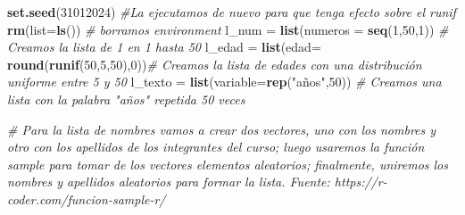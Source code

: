 \documentclass[
]{article}
\newenvironment{Shaded}{\begin{snugshade}}{\end{snugshade}}
\newcommand{\AttributeTok}[1]{\textcolor[rgb]{0.13,0.29,0.53}{#1}}
\newcommand{\CommentTok}[1]{\textcolor[rgb]{0.56,0.35,0.01}{\textit{#1}}}
\newcommand{\DecValTok}[1]{\textcolor[rgb]{0.00,0.00,0.81}{#1}}
\newcommand{\FunctionTok}[1]{\textcolor[rgb]{0.13,0.29,0.53}{\textbf{#1}}}
\newcommand{\NormalTok}[1]{#1}
\newcommand{\OtherTok}[1]{\textcolor[rgb]{0.56,0.35,0.01}{#1}}
\newcommand{\StringTok}[1]{\textcolor[rgb]{0.31,0.60,0.02}{#1}}
\begin{document}
\begin{Shaded}
\begin{Highlighting}[]
\FunctionTok{set.seed}\NormalTok{(}\DecValTok{31012024}\NormalTok{) }\CommentTok{\#La ejecutamos de nuevo para que tenga efecto sobre el runif}
\FunctionTok{rm}\NormalTok{(}\AttributeTok{list=}\FunctionTok{ls}\NormalTok{())   }\CommentTok{\# borramos environment}
\NormalTok{l\_num }\OtherTok{=} \FunctionTok{list}\NormalTok{(}\AttributeTok{numeros =} \FunctionTok{seq}\NormalTok{(}\DecValTok{1}\NormalTok{,}\DecValTok{50}\NormalTok{,}\DecValTok{1}\NormalTok{)) }\CommentTok{\# Creamos la lista de 1 en 1 hasta 50}
\NormalTok{l\_edad }\OtherTok{=} \FunctionTok{list}\NormalTok{(}\AttributeTok{edad=} \FunctionTok{round}\NormalTok{(}\FunctionTok{runif}\NormalTok{(}\DecValTok{50}\NormalTok{,}\DecValTok{5}\NormalTok{,}\DecValTok{50}\NormalTok{),}\DecValTok{0}\NormalTok{))}\CommentTok{\# Creamos la lista de edades con una distribución uniforme entre 5 y 50}
\NormalTok{l\_texto }\OtherTok{=} \FunctionTok{list}\NormalTok{(}\AttributeTok{variable=}\FunctionTok{rep}\NormalTok{(}\StringTok{"años"}\NormalTok{,}\DecValTok{50}\NormalTok{)) }\CommentTok{\# Creamos una lista con la palabra "años" repetida 50 veces}


\CommentTok{\# Para la lista de nombres vamos a crear dos vectores, uno con los nombres y otro con los apellidos de los integrantes del curso; luego usaremos la función sample para tomar de los vectores elementos aleatorios; finalmente, uniremos los nombres y apellidos aleatorios para formar la lista. Fuente: https://r{-}coder.com/funcion{-}sample{-}r/}


\end{Highlighting}
\end{Shaded}
\end{document}
